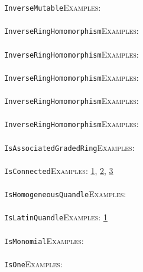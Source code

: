 \documentclass[a4paper,11pt]{report}
\begin{document}
{{ \texttt{InverseMutable}{\nobreakspace}{\nobreakspace}{\nobreakspace}{\nobreakspace}\textsc{Examples:} \\
 \\
 \texttt{InverseRingHomomorphism}{\nobreakspace}{\nobreakspace}{\nobreakspace}{\nobreakspace}\textsc{Examples:} \\
 \\
 \texttt{InverseRingHomomorphism}{\nobreakspace}{\nobreakspace}{\nobreakspace}{\nobreakspace}\textsc{Examples:} \\
 \\
 \texttt{InverseRingHomomorphism}{\nobreakspace}{\nobreakspace}{\nobreakspace}{\nobreakspace}\textsc{Examples:} \\
 \\
 \texttt{InverseRingHomomorphism}{\nobreakspace}{\nobreakspace}{\nobreakspace}{\nobreakspace}\textsc{Examples:} \\
 \\
 \texttt{InverseRingHomomorphism}{\nobreakspace}{\nobreakspace}{\nobreakspace}{\nobreakspace}\textsc{Examples:} \\
 \\
 \texttt{IsAssociatedGradedRing}{\nobreakspace}{\nobreakspace}{\nobreakspace}{\nobreakspace}\textsc{Examples:} \\
 \\
 \texttt{IsConnected}{\nobreakspace}{\nobreakspace}{\nobreakspace}{\nobreakspace}\textsc{Examples:} \href{../www/SideLinks/About/aboutQuandles2.html} {1}{\nobreakspace}, \href{../www/SideLinks/About/aboutQuandles.html} {2}{\nobreakspace}, \href{../www/SideLinks/About/aboutKnotsQuandles.html} {3}{\nobreakspace} \\
 \\
 \texttt{IsHomogeneousQuandle}{\nobreakspace}{\nobreakspace}{\nobreakspace}{\nobreakspace}\textsc{Examples:} \\
 \\
 \texttt{IsLatinQuandle}{\nobreakspace}{\nobreakspace}{\nobreakspace}{\nobreakspace}\textsc{Examples:} \href{../www/SideLinks/About/aboutQuandles.html} {1}{\nobreakspace} \\
 \\
 \texttt{IsMonomial}{\nobreakspace}{\nobreakspace}{\nobreakspace}{\nobreakspace}\textsc{Examples:} \\
 \\
 \texttt{IsOne}{\nobreakspace}{\nobreakspace}{\nobreakspace}{\nobreakspace}\textsc{Examples:} \\
 \\
}}
\end{document}
